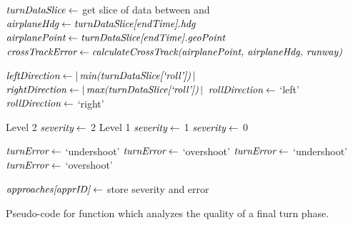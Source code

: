             
            \begin{algorithm}
                \begin{algorithmic}[1]\raggedright
                    \State $ \textit{turnDataSlice} \gets $ get slice of data between  and 
                    \State $ \textit{airplaneHdg} \gets \textit{turnDataSlice[endTime].hdg} $
                    \State $ \textit{airplanePoint} \gets \textit{turnDataSlice[endTime].geoPoint} $
                    \State $ \var{crossTrackError} \gets \var{calculateCrossTrack(} \break \var{airplanePoint, airplaneHdg, runway)} $
                    
                    \State $ \textit{leftDirection} \gets \left|\,\textit{min(turnDataSlice[`roll'])}\,\right| $
                    \State $ \textit{rightDirection} \gets \left|\,\textit{max(turnDataSlice[`roll'])}\,\right| $
                    	\State $ \textit{rollDirection} \gets $ `left'
                    \Else
                    	\State $ \textit{rollDirection} \gets $ `right'
                    \EndIf
                    
                       \Comment Level 2
                    	\State $ \textit{severity} \gets $ 2
                     \Comment Level 1
                    	\State $ \textit{severity} \gets $ 1
                    \Else
                    	\State $ \textit{severity} \gets $ 0
                    \EndIf
                    
                        	\State $ \textit{turnError} \gets $ `undershoot'
                        \Else
                        	\State $ \textit{turnError} \gets $ `overshoot'
                        \EndIf
                    \Else
                        	\State $ \textit{turnError} \gets $ `undershoot'
                        \Else
                        	\State $ \textit{turnError} \gets $ `overshoot'
                        \EndIf
                    \EndIf
                    
                    \State $ \textit{approaches[apprID]} \gets $ store severity and error
                    
                    \State \Return {}
                \EndFunction
                \end{algorithmic}
                \caption{Pseudo-code for function which analyzes the quality of a final turn phase.}
                \label{alg:analyze_final_turn}
            \end{algorithm}
        
